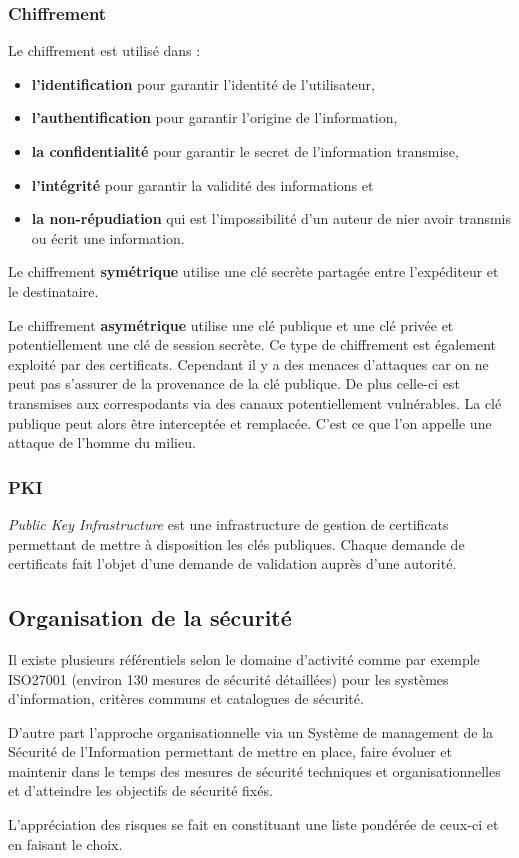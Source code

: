 \documentclass[12pt, a4paper]{article}
\begin{document}
	\subsubsection{Chiffrement}
	Le chiffrement est utilisé dans :
	\begin{itemize}
		\item \textbf{l'identification} pour garantir l'identité de l'utilisateur,
		\item \textbf{l'authentification} pour garantir l'origine de l'information,
		\item \textbf{la confidentialité} pour garantir le secret de l'information transmise,
		\item \textbf{l'intégrité} pour garantir la validité des informations et
		\item \textbf{la non-répudiation} qui est l'impossibilité d'un auteur de nier avoir transmis ou écrit une information.
	\end{itemize}
	Le chiffrement \textbf{symétrique} utilise une clé secrète partagée entre l'expéditeur et le destinataire.
	\par
	Le chiffrement \textbf{asymétrique} utilise une clé publique et une clé privée et potentiellement une clé de session secrète. Ce type de chiffrement est également exploité par des certificats. Cependant il y a des menaces d'attaques car on ne peut pas s'assurer de la provenance de la clé publique. De plus celle-ci est transmises aux correspodants via des canaux potentiellement vulnérables. La clé publique peut alors être interceptée et remplacée. C'est ce que l'on appelle une attaque de l'homme du milieu.
	\subsubsection{PKI}
	\textit{Public Key Infrastructure} est une infrastructure de gestion de certificats permettant de mettre à disposition les clés publiques. Chaque demande de certificats fait l'objet d'une demande de validation auprès d'une autorité.
	\subsection{Organisation de la sécurité}
	Il existe plusieurs référentiels selon le domaine d'activité comme par exemple ISO27001 (environ 130 mesures de sécurité détaillées) pour les systèmes d'information, critères communs et catalogues de sécurité.
	\par
	D'autre part l'approche organisationnelle via un Système de management de la Sécurité de l'Information permettant de mettre en place, faire évoluer et maintenir dans le temps des mesures de sécurité techniques et organisationnelles et d'atteindre les objectifs de sécurité fixés.
	\par
	L'appréciation des risques se fait en constituant une liste pondérée de ceux-ci et en faisant le choix.
\end{document}
